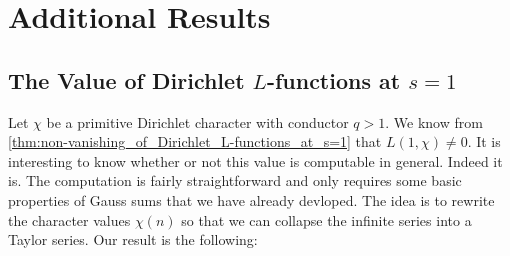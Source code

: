 \chapter{Additional Results}
  \section{The Value of Dirichlet \texorpdfstring{$L$}{L}-functions at \texorpdfstring{$s = 1$}{s = 1}}
      Let $\chi$ be a primitive Dirichlet character with conductor $q > 1$. We know from \cref{thm:non-vanishing_of_Dirichlet_L-functions_at_s=1} that $L(1,\chi) \neq 0$. It is interesting to know whether or not this value is computable in general. Indeed it is. The computation is fairly straightforward and only requires some basic properties of Gauss sums that we have already devloped. The idea is to rewrite the character values $\chi(n)$ so that we can collapse the infinite series into a Taylor series. Our result is the following:
      
